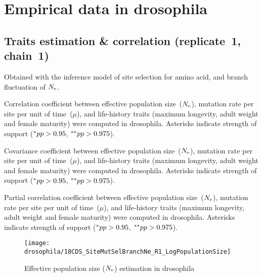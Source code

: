 \section{Empirical data in drosophila}
\label{sec:empirical-data-in-drosophila}

\subsection{Traits estimation \& correlation (replicate~1, chain~1)}
Obtained with the inference model of site selection for amino acid, and branch fluctuation of $N_{\mathrm{e}}$.

\begin{table}[H]
    
    \caption[Correlation coefficient matrix in drosophila ($\dnds$)]{
    Correlation coefficient between effective population size~($N_{\mathrm{e}}$), mutation rate per site per unit of time~($\mu$), and life-history traits (maximum longevity, adult weight and female maturity) were computed in drosophila.
    Asterisks indicate strength of support ($\smash{^{*}} pp > 0.95$, $\smash{^{**}} pp > 0.975$).}
\end{table}

\begin{table}[H]
    
    \caption[Covariance matrix in drosophila]{
    Covariance coefficient between effective population size~($N_{\mathrm{e}}$), mutation rate per site per unit of time~($\mu$), and life-history traits (maximum longevity, adult weight and female maturity) were computed in drosophila.
    Asterisks indicate strength of support ($\smash{^{*}} pp > 0.95$, $\smash{^{**}} pp > 0.975$).}
\end{table}

\begin{table}[H]
    
    \caption[Partial correlation coefficient matrix in drosophila]{
    Partial correlation coefficient between effective population size~($N_{\mathrm{e}}$), mutation rate per site per unit of time~($\mu$), and life-history traits (maximum longevity, adult weight and female maturity) were computed in drosophila.
    Asterisks indicate strength of support ($\smash{^{*}} pp > 0.95$, $\smash{^{**}} pp > 0.975$).}
\end{table}

\begin{figure}[H]
    \centering
    \texttt{[image: drosophila/18CDS\_SiteMutSelBranchNe\_R1\_LogPopulationSize]}
    \caption[Effective population size estimation in drosophila]{Effective population size ($N_{\mathrm{e}}$) estimation in drosophila}
\end{figure}

